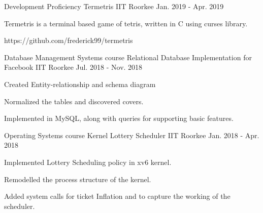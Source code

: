 

\begin{cventries}



     \cventry
    {Development Proficiency } %
    {Termetris} %
    {IIT Roorkee} %
    {Jan. 2019 - Apr. 2019} %
    {
      \begin{cvitems} %
        \item {Termetris is a terminal based game of tetris, written in C using curses library.}
        \item {https://github.com/frederick99/termetris}
      \end{cvitems}
    } 

  \cventry
    {Database Management Systems course} %
    {Relational Database Implementation for Facebook} %
    {IIT Roorkee} %
    {Jul. 2018 - Nov. 2018} %
    {
      \begin{cvitems} %
        \item {Created Entity-relationship and schema diagram}
        \item {Normalized the tables and discovered covers.}
        \item { Implemented in MySQL, along with queries for supporting basic features.}
      \end{cvitems}
    }

 \cventry
    {Operating Systems course} %
    {Kernel Lottery Scheduler} %
    {IIT Roorkee} %
    {Jan. 2018 - Apr. 2018} %
    {
      \begin{cvitems} %
        \item {Implemented Lottery Scheduling policy in xv6 kernel.}
        \item {Remodelled the process structure of the kernel.}
        \item {Added system calls for ticket Inflation and to capture the working of the scheduler.}
      \end{cvitems}
    }


\end{cventries}
